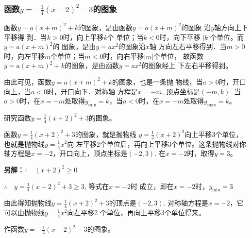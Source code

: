 \subsubsection{函数$y=-\frac{1}{4}(x-2)^2-3$的图象}

函数$y=a(x+m)^2+k$的图象，是由函数$y=a(x+m)^2$的图象
沿$y$轴方向上下平移得
到．当$k>0$时，向上平移$k$个
单位；当$k<0$时，向下平移
$|k|$个单位。而$y=a(x+m)^2$的
图象，是由$y=ax^2$的图象沿$x$轴
方向左右平移得到．当$m>0$
时，向左平移$m$个单位；当$m<0$时，向右平移$|m|$个单位，
故函数$y=a(x+m)^2+k$的图象，是由函数$y=ax^2$的图象经上
下左右平移得到。

由此可见，函数$y=a(x+m)^2+k$的图象，也是一条抛
物线，当$a>0$时，开口向上，当$a<0$时，开口向下．对称轴
方程是$x=-m$, 顶点坐标是$(-m,k)$. 当$a>0$时，在$x=
-m$处取得$y_{\min}=k$，当$a<0$时，在$x=-m$处取得$y_{\max}=k$。

\begin{example}
    研究函数$y=\frac{1}{4}(x+2)^2+3$的图象。
\end{example}

\begin{solution}
函数$y=\frac{1}{4}(x+2)^2+3$的图象，就是抛物线
$y=\frac{1}{4}(x+2)^2$向上平移3个单位，也就是抛物线$y=\frac{1}{4}x^2$向
左平移2个单位后，再向上平移3个单位。这条抛物线对你
轴方程是$x=-2$，开口向上，顶点坐标是$(-2,3)$. 在$x=-2$时，取得$y=3$。

\textbf{另解：}$\because\quad (x+2)^2\ge 0$

$\therefore\quad y=\frac{1}{4}(x+2)^2+3\ge 3$, 等式在$x=-2$时
成立，即在$x=-2$时，$y_{\min}=3$

由此得知抛物线$y=\frac{1}{4}(x+2)^2+3$的顶点是$(-2,3)$. 
对称轴方程是$x=-2$，它可以由抛物线$y=\frac{1}{4}x^2$向左平移2
个单位，再向上平移3个单位得来。
\end{solution}


\begin{example}
    作函数$y=-\frac{1}{4}(x-2)^2-3$的图象。
\end{example}

